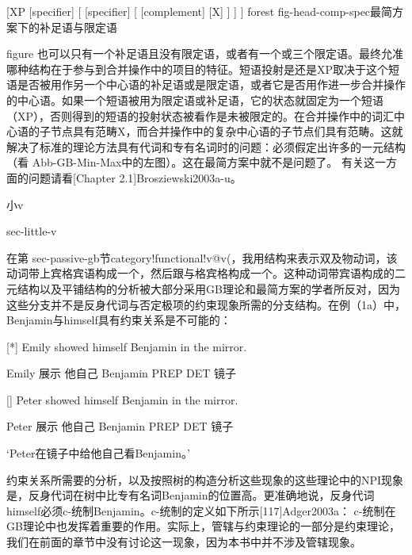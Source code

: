 [XP
  [specifier]
  [
    [specifier]
    [
      [complement] [X] ] ] ]
forest
fig-head-comp-spec最简方案下的补足语与限定语

figure
也可以只有一个补足语且没有限定语，或者有一个或三个限定语。最终允准哪种结构在于参与到合并操作中的项目的特征。短语投射是还是XP取决于这个短语是否被用作另一个中心语的补足语或是限定语，或者它是否用作进一步合并操作的中心语。如果一个短语被用为限定语或补足语，它的状态就固定为一个短语（XP），否则得到的短语的投射状态被看作是未被限定的。在合并操作中的词汇中心语的子节点具有范畴X，而合并操作中的复杂中心语的子节点们具有范畴。这就解决了标准的理论方法具有代词和专有名词时的问题：必须假定出许多的一元结构（看 Abb-GB-Min-Max中的左图）。这在最简方案中就不是问题了。 
有关这一方面的问题请看[Chapter 2.1]Brosziewski2003a-u。



















小v

sec-little-v

在第 sec-passive-gb节category!functional!v@v(，我用结构来表示双及物动词，该动词带上宾格宾语构成一个，然后跟与格宾格构成一个。这种动词带宾语构成的二元结构以及平铺结构的分析被大部分采用GB理论和最简方案的学者所反对，因为这些分支并不是反身代词与否定极项的约束现象所需的分支结构。在例（1a）中，Benjamin与himself具有约束关系是不可能的：








[*]
Emily showed himself Benjamin in the mirror.

Emily 展示 他自己 Benjamin PREP DET 镜子


[]
Peter showed himself Benjamin in the mirror.

Peter 展示 他自己 Benjamin PREP DET 镜子

`Peter在镜子中给他自己看Benjamin。'


约束关系所需要的分析，以及按照树的构造分析这些现象的这些理论中的NPI现象是，反身代词在树中比专有名词Benjamin的位置高。更准确地说，反身代词himself必须c-统制Benjamin。c-统制的定义如下所示[117]Adger2003a： 
c-统制在GB理论中也发挥着重要的作用。实际上，管辖与约束理论的一部分是约束理论，我们在前面的章节中没有讨论这一现象，因为本书中并不涉及管辖现象。










